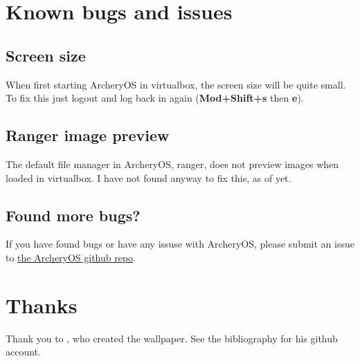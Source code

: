 \documentclass{article}
\begin{document}
\pagebreak

\section{Known bugs and issues}
\subsection{Screen size}
When first starting ArcheryOS in virtualbox, the screen size will be quite small. To fix this just logout and log back in again (\textbf{Mod+Shift+s} then \textbf{e}).
\subsection{Ranger image preview}
The default file manager in ArcheryOS, ranger, does not preview images when loaded in virtualbox. I have not found anyway to fix this, as of yet.

\subsection{Found more bugs?}
If you have found bugs or have any issuse with ArcheryOS, please submit an issue to \href{https://github.com/H0ll0wp0int/ArcheryOS-build-files}{the ArcheryOS github repo}.



\pagebreak
\section{Thanks}
Thank you to \textcite{Wallpape}, who created the wallpaper. See the bibliography for his github account.

\pagebreak
\printbibliography
\end{document}
